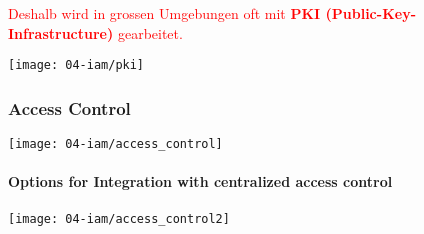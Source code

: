 \textcolor{red}{Deshalb wird in grossen Umgebungen oft mit \textbf{PKI (Public-Key-Infrastructure)} gearbeitet.}

\begin{center}
    \texttt{[image: 04-iam/pki]}
    \vspace{-8pt}
\end{center}

\subsubsection{Access Control}
\begin{center}
    \texttt{[image: 04-iam/access\_control]}
    \vspace{-8pt}
\end{center}

\paragraph{Options for Integration with centralized access control}
\begin{center}
    \texttt{[image: 04-iam/access\_control2]}
    \vspace{-8pt}
\end{center}

